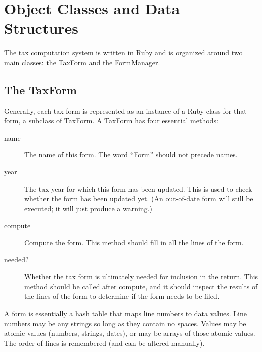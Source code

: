 \documentclass[12pt]{article}
\begin{document}
\section{Object Classes and Data Structures}

The tax computation system is written in Ruby and is organized around two main
classes: the TaxForm and the FormManager.


\subsection{The TaxForm}

Generally, each tax form is represented as an instance of a Ruby class for that
form, a subclass of TaxForm. A TaxForm has four essential methods:
\begin{description}
\item[name] The name of this form. The word ``Form'' should not precede names.
\item[year] The tax year for which this form has been updated. This is used to
check whether the form has been updated yet. (An out-of-date form will still
be executed; it will just produce a warning.)
\item[compute] Compute the form. This method should fill in all the lines of the
form.
\item[needed?] Whether the tax form is ultimately needed for inclusion in the
return. This method should be called after compute, and it should inspect the
results of the lines of the form to determine if the form needs to be filed.
\end{description}

A form is essentially a hash table that maps line numbers to data values. Line
numbers may be any strings so long as they contain no spaces. Values may be
atomic values (numbers, strings, dates), or may be arrays of those atomic
values. The order of lines is remembered (and can be altered manually).
\end{document}
